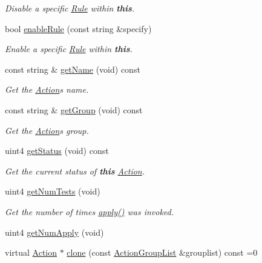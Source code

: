 \begin{DoxyCompactItemize}
\begin{DoxyCompactList}\small\item\em Disable a specific \mbox{\hyperlink{class_rule}{Rule}} within {\bfseries{this}}. \end{DoxyCompactList}\item 
bool \mbox{\hyperlink{class_action_a1ed085983061bb5fac5560554af33d74}{enable\+Rule}} (const string \&specify)
\begin{DoxyCompactList}\small\item\em Enable a specific \mbox{\hyperlink{class_rule}{Rule}} within {\bfseries{this}}. \end{DoxyCompactList}\item 
const string \& \mbox{\hyperlink{class_action_a0db87bda6499163fe29bae6c33383c5b}{get\+Name}} (void) const
\begin{DoxyCompactList}\small\item\em Get the \mbox{\hyperlink{class_action}{Action}}\textquotesingle{}s name. \end{DoxyCompactList}\item 
const string \& \mbox{\hyperlink{class_action_a8315ffdbefea57371464cb5f8002995d}{get\+Group}} (void) const
\begin{DoxyCompactList}\small\item\em Get the \mbox{\hyperlink{class_action}{Action}}\textquotesingle{}s group. \end{DoxyCompactList}\item 
uint4 \mbox{\hyperlink{class_action_a8feb7d10db168e8e92a39d6df995f375}{get\+Status}} (void) const
\begin{DoxyCompactList}\small\item\em Get the current status of {\bfseries{this}} \mbox{\hyperlink{class_action}{Action}}. \end{DoxyCompactList}\item 
uint4 \mbox{\hyperlink{class_action_adb54fc152a449d8f4879ed3817e60510}{get\+Num\+Tests}} (void)
\begin{DoxyCompactList}\small\item\em Get the number of times \mbox{\hyperlink{class_action_aac1c3999d6c685b15f5d9765a4d04173}{apply()}} was invoked. \end{DoxyCompactList}\item 
uint4 \mbox{\hyperlink{class_action_aa0251eaca46502e85d3c691691855c3e}{get\+Num\+Apply}} (void)
\item 
virtual \mbox{\hyperlink{class_action}{Action}} $\ast$ \mbox{\hyperlink{class_action_af8242e41d09e5df52f97df9e65cc626f}{clone}} (const \mbox{\hyperlink{class_action_group_list}{Action\+Group\+List}} \&grouplist) const =0

\end{DoxyCompactItemize}
